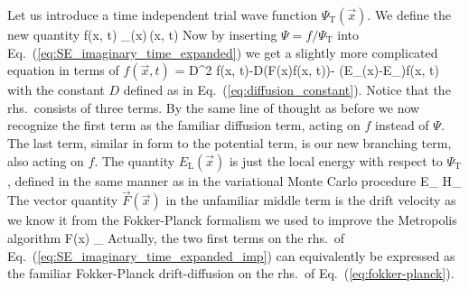 Let us
introduce a time independent trial wave function $\Psi_\mathrm{T}(\vec
x)$. We define the new quantity
\bdm
f(\vec x, t) \equiv \Psi_(\vec x)\,\Psi(\vec x, t)
\edm
Now by inserting $\Psi=f/\Psi_\mathrm{T}$ into
Eq.~(\ref{eq:SE_imaginary_time_expanded}) we get a slightly more
complicated equation in terms of $f(\vec x,t)$
\be
{} =
D\nabla^2 f(\vec x, t)-D\vec\nabla(\vec F(\vec x)f(\vec x, t))-
(E_{}(\vec x)-E_{})f(\vec x, t)
\label{eq:SE_imaginary_time_expanded_imp}
\ee
with the constant $D$ defined as in
Eq.~(\ref{eq:diffusion_constant}). Notice that the
rhs.~consists of three terms. By the same line of thought as before
we now recognize the first term as the familiar diffusion term, acting
on $f$ instead of $\Psi$. The last term, similar in form to the
potential term, is our new branching term, also acting on $f$. The
quantity $E_\mathrm{L}(\vec x)$ is just the local energy with respect
to $\Psi_{\mathrm{T}}$, defined in the same manner as in the variational Monte Carlo procedure
\bdm
E_{} \equiv
{}\op H\Psi_
\edm
The vector quantity $\vec F(\vec x)$ in the unfamiliar middle term is
the drift velocity as we know it from the Fokker-Planck formalism we
used to improve the Metropolis algorithm
\be
\vec F(\vec x)\equiv
{}\vec\nabla\Psi_
\label{eq:drift_velocity_DMC}
\ee
Actually, the two first terms on the rhs.~of
Eq.~(\ref{eq:SE_imaginary_time_expanded_imp}) can equivalently be
expressed as the familiar Fokker-Planck drift-diffusion on the rhs.~of
Eq.~(\ref{eq:fokker-planck}).

